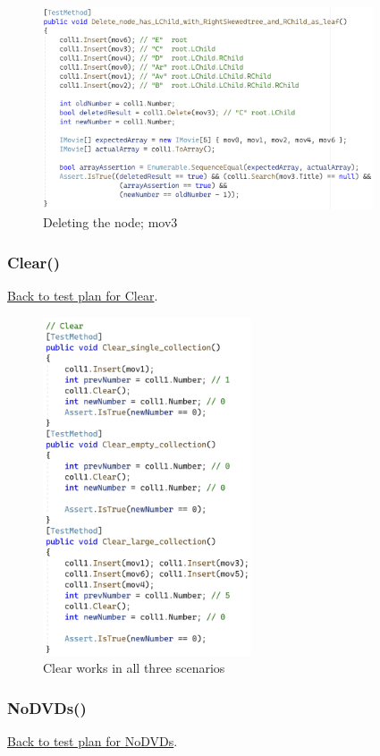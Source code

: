 \documentclass[a4paper]{article}
\begin{document}
\begin{figure}[H]
    \includegraphics[height=6cm]{data/Delete_node_has_LChild_with_RightSkewedtree_and_RChild_as_leaf.png}
    \caption{Deleting the node; mov3}
\end{figure}

\pagebreak

\subsubsection{Clear{()}}
\hyperlink{subsubsection.3.2.6}{Back to test plan for Clear}.

\begin{figure}[H]
    \includegraphics[height=10cm]{data/Clear-code.png}
    \caption{Clear works in all three scenarios}
\end{figure}

\subsubsection{NoDVDs{()}}
\hyperlink{subsubsection.3.2.7}{Back to test plan for NoDVDs}.
\end{document}

